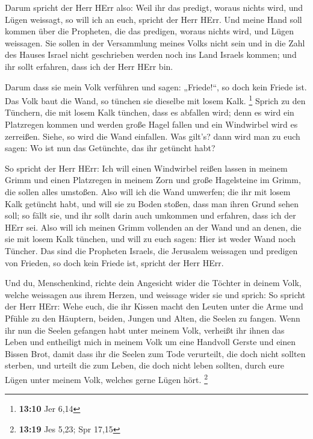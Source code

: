  Darum spricht der Herr HErr also: Weil ihr das predigt,
woraus nichts wird, und Lügen weissagt, so will ich an euch, spricht der
Herr HErr.  Und meine Hand soll kommen über die Propheten,
die das predigen, woraus nichts wird, und Lügen weissagen. Sie sollen in
der Versammlung meines Volks nicht sein und in die Zahl des Hauses
Israel nicht geschrieben werden noch ins Land Israels kommen; und ihr
sollt erfahren, dass ich der Herr HErr bin.

 Darum dass sie mein Volk verführen und sagen:
„Friede!{}``, so doch kein Friede ist. Das Volk baut die Wand, so
tünchen sie dieselbe mit losem Kalk. \footnote{\textbf{13:10} Jer 6,14}
 Sprich zu den Tünchern, die mit losem Kalk tünchen, dass
es abfallen wird; denn es wird ein Platzregen kommen und werden große
Hagel fallen und ein Windwirbel wird es zerreißen.  Siehe,
so wird die Wand einfallen. Was gilt's? dann wird man zu euch sagen: Wo
ist nun das Getünchte, das ihr getüncht habt?

 So spricht der Herr HErr: Ich will einen Windwirbel reißen
lassen in meinem Grimm und einen Platzregen in meinem Zorn und große
Hagelsteine im Grimm, die sollen alles umstoßen.  Also will
ich die Wand umwerfen; die ihr mit losem Kalk getüncht habt, und will
sie zu Boden stoßen, dass man ihren Grund sehen soll; so fällt sie, und
ihr sollt darin auch umkommen und erfahren, dass ich der HErr sei.
 Also will ich meinen Grimm vollenden an der Wand und an
denen, die sie mit losem Kalk tünchen, und will zu euch sagen: Hier ist
weder Wand noch Tüncher.  Das sind die Propheten Israels,
die Jerusalem weissagen und predigen von Frieden, so doch kein Friede
ist, spricht der Herr HErr.

 Und du, Menschenkind, richte dein Angesicht wider die
Töchter in deinem Volk, welche weissagen aus ihrem Herzen, und weissage
wider sie  und sprich: So spricht der Herr HErr: Wehe euch,
die ihr Kissen macht den Leuten unter die Arme und Pfühle zu den
Häuptern, beiden, Jungen und Alten, die Seelen zu fangen. Wenn ihr nun
die Seelen gefangen habt unter meinem Volk, verheißt ihr ihnen das Leben
 und entheiligt mich in meinem Volk um eine Handvoll Gerste
und einen Bissen Brot, damit dass ihr die Seelen zum Tode verurteilt,
die doch nicht sollten sterben, und urteilt die zum Leben, die doch
nicht leben sollten, durch eure Lügen unter meinem Volk, welches gerne
Lügen hört. \footnote{\textbf{13:19} Jes 5,23; Spr 17,15}

